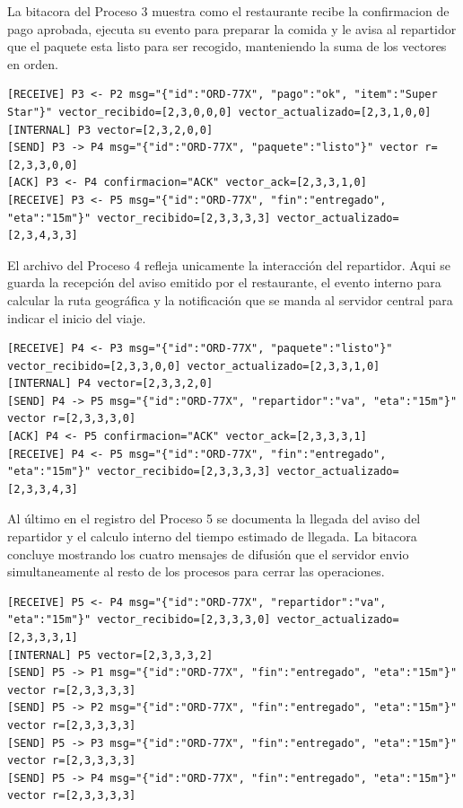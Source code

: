 \documentclass[letterpaper,11pt]{article}
\begin{document}
La bitacora del Proceso 3 muestra como el restaurante recibe la confirmacion de pago aprobada, ejecuta su evento para preparar la comida y le avisa al repartidor que el paquete esta listo para ser recogido, manteniendo la suma de los vectores en orden.

\begin{lstlisting}[style=output]
[RECEIVE] P3 <- P2 msg="{"id":"ORD-77X", "pago":"ok", "item":"Super Star"}" vector_recibido=[2,3,0,0,0] vector_actualizado=[2,3,1,0,0]
[INTERNAL] P3 vector=[2,3,2,0,0]
[SEND] P3 -> P4 msg="{"id":"ORD-77X", "paquete":"listo"}" vector r=[2,3,3,0,0]
[ACK] P3 <- P4 confirmacion="ACK" vector_ack=[2,3,3,1,0]
[RECEIVE] P3 <- P5 msg="{"id":"ORD-77X", "fin":"entregado", "eta":"15m"}" vector_recibido=[2,3,3,3,3] vector_actualizado=[2,3,4,3,3]
\end{lstlisting}

El archivo del Proceso 4 refleja unicamente la interacción del repartidor. Aqui se guarda la recepción del aviso emitido por el restaurante, el evento interno para calcular la ruta geográfica y la notificación que se manda al servidor central para indicar el inicio del viaje.

\begin{lstlisting}[style=output]
[RECEIVE] P4 <- P3 msg="{"id":"ORD-77X", "paquete":"listo"}" vector_recibido=[2,3,3,0,0] vector_actualizado=[2,3,3,1,0]
[INTERNAL] P4 vector=[2,3,3,2,0]
[SEND] P4 -> P5 msg="{"id":"ORD-77X", "repartidor":"va", "eta":"15m"}" vector r=[2,3,3,3,0]
[ACK] P4 <- P5 confirmacion="ACK" vector_ack=[2,3,3,3,1]
[RECEIVE] P4 <- P5 msg="{"id":"ORD-77X", "fin":"entregado", "eta":"15m"}" vector_recibido=[2,3,3,3,3] vector_actualizado=[2,3,3,4,3]
\end{lstlisting}

Al último en el registro del Proceso 5 se documenta la llegada del aviso del repartidor y el calculo interno del tiempo estimado de llegada. La bitacora concluye mostrando los cuatro mensajes de difusión que el servidor envio simultaneamente al resto de los procesos para cerrar las operaciones.

\begin{lstlisting}[style=output]
[RECEIVE] P5 <- P4 msg="{"id":"ORD-77X", "repartidor":"va", "eta":"15m"}" vector_recibido=[2,3,3,3,0] vector_actualizado=[2,3,3,3,1]
[INTERNAL] P5 vector=[2,3,3,3,2]
[SEND] P5 -> P1 msg="{"id":"ORD-77X", "fin":"entregado", "eta":"15m"}" vector r=[2,3,3,3,3]
[SEND] P5 -> P2 msg="{"id":"ORD-77X", "fin":"entregado", "eta":"15m"}" vector r=[2,3,3,3,3]
[SEND] P5 -> P3 msg="{"id":"ORD-77X", "fin":"entregado", "eta":"15m"}" vector r=[2,3,3,3,3]
[SEND] P5 -> P4 msg="{"id":"ORD-77X", "fin":"entregado", "eta":"15m"}" vector r=[2,3,3,3,3]
\end{lstlisting}
\end{document}

